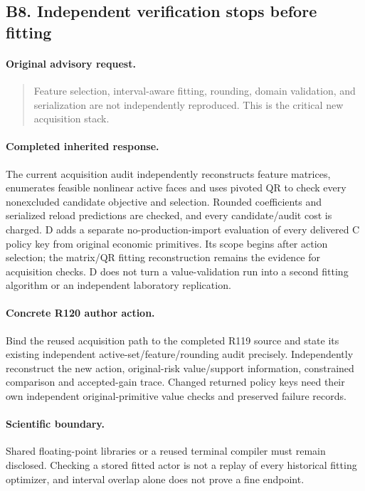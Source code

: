\subsection{B8. Independent verification stops before fitting}
\label{response120:B8}
\paragraph{Original advisory request.}
\begin{quote}
Feature selection, interval-aware fitting, rounding, domain validation, and serialization are not independently reproduced. This is the critical new acquisition stack.
\end{quote}
\paragraph{Completed inherited response.}
The current acquisition audit independently reconstructs feature matrices, enumerates feasible nonlinear active faces and uses pivoted QR to check every nonexcluded candidate objective and selection. Rounded coefficients and serialized reload predictions are checked, and every candidate/audit cost is charged. D adds a separate no-production-import evaluation of every delivered C policy key from original economic primitives. Its scope begins after action selection; the matrix/QR fitting reconstruction remains the evidence for acquisition checks. D does not turn a value-validation run into a second fitting algorithm or an independent laboratory replication.
\paragraph{Concrete R120 author action.}
Bind the reused acquisition path to the completed R119 source and state its existing independent active-set/feature/rounding audit precisely. Independently reconstruct the new action, original-risk value/support information, constrained comparison and accepted-gain trace. Changed returned policy keys need their own independent original-primitive value checks and preserved failure records.
\paragraph{Scientific boundary.}
Shared floating-point libraries or a reused terminal compiler must remain disclosed. Checking a stored fitted actor is not a replay of every historical fitting optimizer, and interval overlap alone does not prove a fine endpoint.

